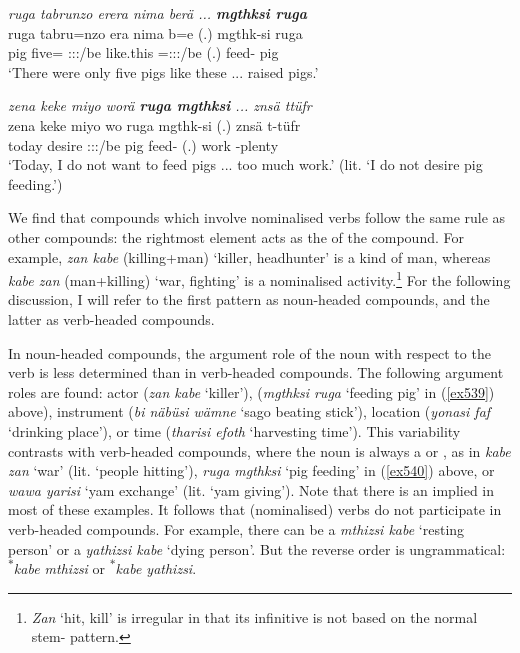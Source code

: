 \begin{exe}
	\ex \emph{ruga tabrunzo erera nima berä ... \textbf{mgthksi ruga}}\\
	\gll ruga tabru=nzo era nima b=e (.) mgthk-si ruga\\
	pig five={\Only} \Stpl:\Sbj:\Pst:\Ipfv/be {like.this} \Med=\Stpl:\Sbj:\Nonpast:\Ipfv/be (.) feed-{\Nmlz} pig\\
	\trans `There were only five pigs like these ... raised pigs.'
	\label{ex539}
\end{exe}
\begin{exe}
	\ex \emph{zena keke miyo worä \textbf{ruga mgthksi} ... znsä ttüfr}\\
	\gll zena keke miyo wo ruga mgthk-si (.) znsä t-tüfr\\
	today {\Neg} desire \Fsg:\Sbj:\Nonpast:\Ipfv/be pig feed-{\Nmlz} (.) work \Redup-plenty\\
	\trans `Today, I do not want to feed pigs ... too much work.' (lit. `I do not desire pig feeding.')
	\label{ex540}
\end{exe}

We find that compounds which involve nominalised verbs follow the same rule as other compounds: the rightmost element acts as the  of the compound. For example, \emph{zan kabe} (killing+man) `killer, headhunter' is a kind of man, whereas \emph{kabe zan} (man+killing) `war, fighting' is a nominalised activity.\footnote{\emph{Zan} `hit, kill' is irregular in that its infinitive is not based on the normal stem-{\Nmlz} pattern.} For the following discussion, I will refer to the first pattern as noun-headed compounds, and the latter as verb-headed compounds.

In noun-headed compounds, the argument role of the noun with respect to the verb is less determined than in verb-headed compounds. The following argument roles are found: actor (\emph{zan kabe} `killer'),  (\emph{mgthksi ruga} `feeding pig' in (\ref{ex539}) above), instrument (\emph{bi näbüsi wämne} `sago beating stick'), location (\emph{yonasi faf} `drinking place'), or time (\emph{tharisi efoth} `harvesting time'). This variability contrasts with verb-headed compounds, where the noun is always a  or , as in \emph{kabe zan} `war' (lit. `people hitting'), \emph{ruga mgthksi} `pig feeding' in (\ref{ex540}) above, or \emph{wawa yarisi} `yam exchange' (lit. `yam giving'). Note that there is an implied  in most of these examples. It follows that (nominalised)  verbs do not participate in verb-headed compounds. For example, there can be a \emph{mthizsi kabe} `resting person' or a \emph{yathizsi kabe} `dying person'. But the reverse order is ungrammatical: \textsuperscript{$\ast$}\emph{kabe mthizsi} or \textsuperscript{$\ast$}\emph{kabe yathizsi}.

